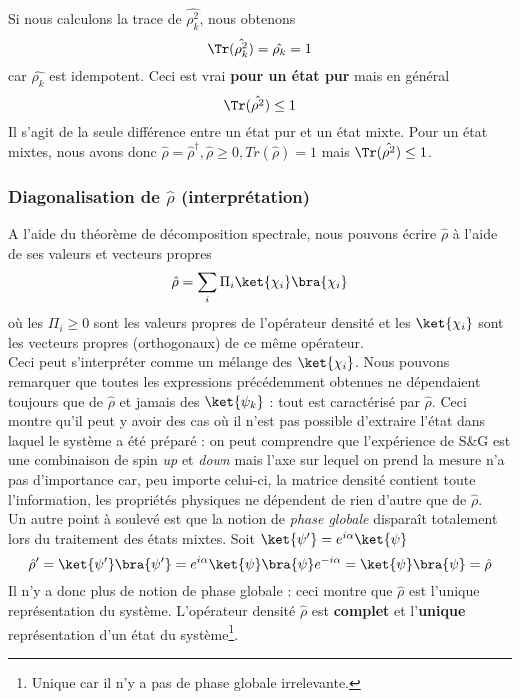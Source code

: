 Si nous calculons la trace de $\hat{\rho_k^2}$, nous obtenons
\begin{equation}
\Tr(\hat{\rho_k^2}) = \hat{\rho_k} = 1
\end{equation}
car $\hat{\rho_k}$ est idempotent. Ceci est vrai \textbf{pour un état pur} mais en général
\begin{equation}
\Tr(\hat{\rho^2}) \leq 1
\end{equation}
Il s'agit de la seule différence entre un état pur et un état mixte. Pour un état mixtes, nous avons donc $\hat{\rho}
=\hat{\rho}^\dagger, \hat{\rho}\geq 0, Tr(\hat{\rho})=1$ mais $\Tr(\hat{\rho^2})\leq 1$.


\subsubsection{Diagonalisation de $\hat\rho$ (interprétation)}
A l'aide du théorème de décomposition spectrale, nous pouvons écrire $\hat{\rho}$ à l'aide de ses valeurs 
et vecteurs propres
\begin{equation}
\hat{\rho} = \sum_i \Pi_i \ket{\chi_i}\bra{\chi_i}
\end{equation}
où les $\Pi_i \geq 0$ sont les valeurs propres de l'opérateur densité et les $\ket{\chi_i}$ sont les vecteurs propres 
(orthogonaux) de ce même opérateur. \\

Ceci peut s'interpréter comme un mélange des $\ket{\chi_i}$. Nous pouvons remarquer que toutes les expressions 
précédemment obtenues ne dépendaient toujours que de $\hat{\rho}$ et jamais des $\ket{\psi_k}$ : tout est 
caractérisé par $\hat{\rho}$. Ceci montre qu'il peut y avoir des cas où il n'est pas possible d'extraire l'état 
dans laquel le système a été préparé : on peut comprendre que l'expérience de S\&G  est une combinaison de spin 
\textit{up} et \textit{down} mais l'axe sur lequel on prend la mesure n'a pas d'importance car, peu importe 
celui-ci, la matrice densité contient toute l’information, les propriétés physiques ne dépendent de rien d'autre 
que de $\hat{\rho}$.\\


Un autre point à soulevé est que la notion de \textit{phase globale} disparaît totalement lors du traitement des 
états mixtes. Soit $\ket{\psi'} = e^{i\alpha}\ket{\psi}$
\begin{equation}
\hat{\rho}' = \ket{\psi'}\bra{\psi'} = e^{i\alpha}\ket{\psi}\bra{\psi}e^{-i\alpha} = \ket{\psi}\bra{\psi}= \hat{\rho}
\end{equation}
Il n'y a donc plus de notion de phase globale : ceci montre que $\hat{\rho}$ est l'unique représentation du système. 
L'opérateur densité $\hat{\rho}$ est \textbf{complet} et l'\textbf{unique} représentation d'un état du système\footnote{Unique 
car il n'y a pas de phase globale irrelevante.}.\\

